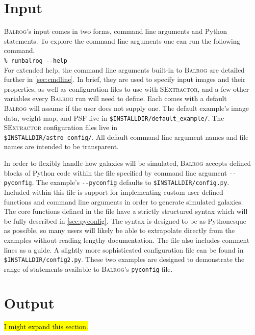 \documentclass[12pt]{book}
\newcommand{\py}{Python}
\newcommand{\pyconfig}{\texttt{pyconfig}}
\newcommand{\balrog}{\textsc{Balrog}}
\newcommand{\sex}{\textsc{SExtractor}}
\newcommand{\opt}[1]{{\texttt{-}\texttt{-#1}}}
\newcommand{\inline}{\\[0.4cm]}
\newcommand{\bcmd}[1]{\texttt{\% runbalrog #1}}
\begin{document}
\section{Input}
\label{sec:input}

\balrog{}'s input comes in two forms, command line arguments and \py{} statements.
To explore the command line arguments one can run the following command.
\inline
\bcmd{\opt{help}}
\inline
For extended help, the command line arguments built-in to \balrog{} are detailed further in \autoref{sec:cmdline}.
In brief, they are used to specify input images and their properties, as well as configuration
files to use with \sex{}, and a few other variables every \balrog{} run will need to define. 
Each comes with a default \balrog{} will assume if the user does not supply one.
The default example's image data, weight map, and PSF live in \texttt{\$INSTALLDIR/default\_example/}.
The \sex{} configuration files live in 
\\ \texttt{\$INSTALLDIR/astro\_config/}. 
All default command line argument names and file names are intended to be transparent.

In order to flexibly handle how galaxies will be simulated, \balrog{} accepts defined blocks of \py{} code
within the file specified by command line argument \opt{pyconfig}.
The example's \opt{pyconfig} defaults to \texttt{\$INSTALLDIR/config.py}.
Included within this file is support for implementing custom user-defined functions 
and command line arguments in order to generate simulated galaxies.
The core functions defined in the file have a strictly
structured syntax which will be fully described in \autoref{sec:pyconfig}. The syntax is designed to be as \py esque as possible, so
many users will likely be able to extrapolate directly from the examples without reading lengthy documentation. The file also
includes comment lines as a guide. A slightly more sophisticated configuration file can be found in \texttt{\$INSTALLDIR/config2.py}.
These two examples are designed to demonstrate the range of statements available to \balrog{}'s \pyconfig{} file.


\section{Output}
\label{sec:output}

\hl{I might expand this section.}
\end{document}
